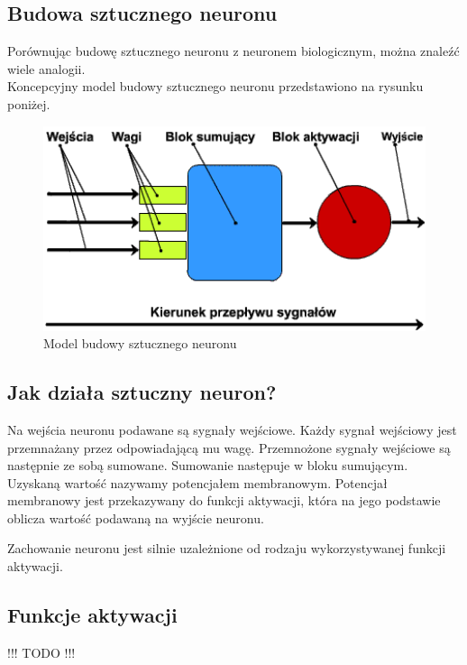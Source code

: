 \newpage
\subsection{Budowa sztucznego neuronu}
Porównując budowę sztucznego neuronu z neuronem biologicznym, można znaleźć wiele analogii. \\
Koncepcyjny model budowy sztucznego neuronu przedstawiono na rysunku poniżej.

\vspace{1cm}
\begin{figure}[h]
\begin{center}
\includegraphics[width=15cm]{resources/figures/artificial_neuron.png}
\caption{Model budowy sztucznego neuronu}
\end{center}
\end{figure}

\subsection{Jak działa sztuczny neuron?}
Na wejścia neuronu podawane są sygnały wejściowe. Każdy sygnał wejściowy
jest przemnażany przez odpowiadającą mu wagę.
Przemnożone sygnały wejściowe są następnie ze sobą sumowane.
Sumowanie następuje w bloku sumującym.
Uzyskaną wartość nazywamy potencjałem membranowym.
Potencjał membranowy jest przekazywany do funkcji aktywacji, która na jego
podstawie oblicza wartość podawaną na wyjście neuronu.

Zachowanie neuronu jest silnie uzależnione od rodzaju wykorzystywanej funkcji
aktywacji.

\subsection{Funkcje aktywacji}
\begin{large}
!!! TODO !!!
\end{large}

